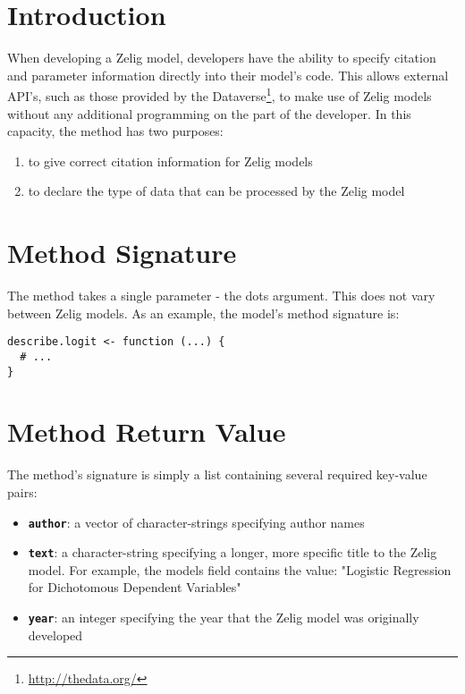 %
%

\section{Introduction}
\label{section:describe-introduction}

When developing a Zelig model, developers have the ability to specify citation and parameter information directly into their model's code. This allows external API's, such as those provided by the Dataverse\footnote{\url{http://thedata.org/}}, to make use of Zelig models without any additional programming on the part of the developer. In this capacity, the  method has two purposes:

\begin{enumerate}
	\item{to give correct citation information for Zelig models}
	\item{to declare the type of data that can be processed by the Zelig model}
\end{enumerate}


\section{ Method Signature}
\label{section:describe-signature}

The  method takes a single parameter - the dots argument. This does not vary between Zelig models. As an example, the  model's method signature is:

\begin{verbatim}
describe.logit <- function (...) {
  # ...
}

\end{verbatim}



\section{ Method Return Value}
\label{section:describe-return-value}

The  method's signature is simply a list containing several required key-value pairs:

\begin{itemize}
  \item {\bf \tt author}: a vector of character-strings specifying author names
  \item {\bf \tt text}: a character-string specifying a longer, more specific title to the Zelig model. For example, the  models  field contains the value: "Logistic Regression for Dichotomous Dependent Variables"
  \item {\bf \tt year}: an integer specifying the year that the Zelig model was originally developed
\end{itemize}

